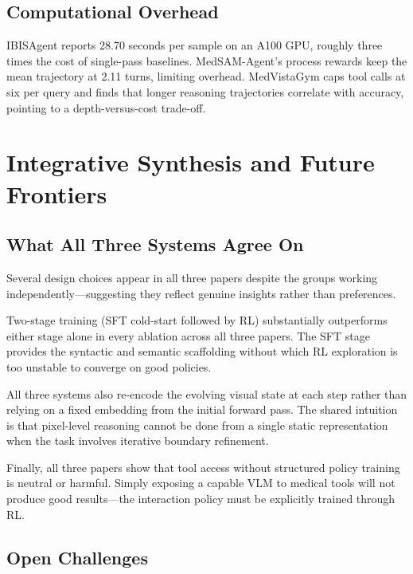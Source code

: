 \documentclass[12pt, a4paper]{article}
\begin{document}
\subsection{Computational Overhead}

IBISAgent reports 28.70 seconds per sample on an A100 GPU, roughly three times the
cost of single-pass baselines.
MedSAM-Agent's process rewards keep the mean trajectory at 2.11 turns, limiting
overhead.
MedVistaGym caps tool calls at six per query and finds that longer reasoning
trajectories correlate with accuracy, pointing to a depth-versus-cost trade-off.

\section{Integrative Synthesis and Future Frontiers}
\label{sec:synthesis}

\subsection{What All Three Systems Agree On}

Several design choices appear in all three papers despite the groups working
independently---suggesting they reflect genuine insights rather than preferences.

Two-stage training (SFT cold-start followed by RL) substantially outperforms either
stage alone in every ablation across all three papers.
The SFT stage provides the syntactic and semantic scaffolding without which RL
exploration is too unstable to converge on good policies.

All three systems also re-encode the evolving visual state at each step rather than
relying on a fixed embedding from the initial forward pass.
The shared intuition is that pixel-level reasoning cannot be done from a single static
representation when the task involves iterative boundary refinement.

Finally, all three papers show that tool access without structured policy training is
neutral or harmful.
Simply exposing a capable VLM to medical tools will not produce good results---the
interaction policy must be explicitly trained through RL.

\subsection{Open Challenges}
\end{document}
